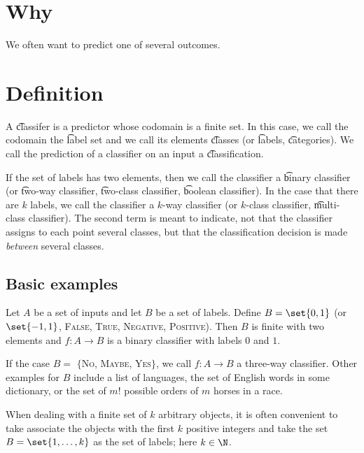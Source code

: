 

\section*{Why}

We often want to predict one of several outcomes.

\section*{Definition}

A \t{classifer} is a predictor whose codomain is a finite set.
In this case, we call the codomain the \t{label set} and we call its elements \t{classes} (or \t{labels}, \t{categories}).
We call the prediction of a classifier on an input a \t{classification}.

If the set of labels has two elements, then we call the classifier a \t{binary classifier} (or \t{two-way classifier}, \t{two-class classifier}, \t{boolean classifier}).
In the case that there are $k$ labels, we call the classifier a \t{$k$-way classifier} (or \t{$k$-class classifier}, \t{multi-class classifier}).
The second term is meant to indicate, not that the classifier assigns to each point several classes, but that the classification decision is made \textit{between} several classes.

\subsection*{Basic examples}

Let $A$ be a set of inputs and let $B$ be a set of labels.
Define $B = \set{0, 1}$ (or $\set{-1,1}$, {\textsc{False}, \textsc{True}}, {\textsc{Negative}, \textsc{Positive}}).
Then $B$ is finite with two elements and $f: A \to B$ is a binary classifier with labels $0$ and $1$.

If the case $B = $ $\{$\textsc{No}, \textsc{Maybe}, \textsc{Yes}$\}$, we call $f: A \to B$ a three-way classifier.
Other examples for $B$ include a list of languages, the set of English words in some dictionary, or the set of $m!$ possible orders of $m$ horses in a race.

When dealing with a finite set of $k$ arbitrary objects, it is often convenient to take associate the objects with the first $k$ positive integers and take the set $B = \set{1, \dots , k}$ as the set of labels; here $k \in \N  $.

